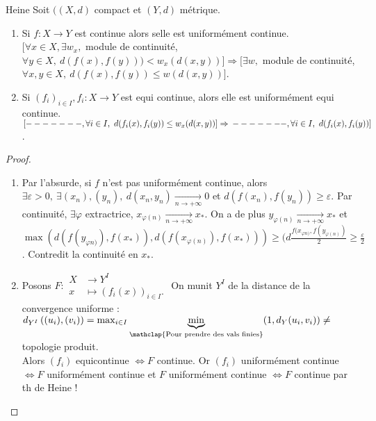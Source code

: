 \begin{theoreme}{Heine}
    Soit $((X,d)$ compact et $(Y,d)$ métrique.
    \begin{enumerate}
        \item Si $f:X\to Y$ est continue alors selle est uniformément continue.\\
            $[\forall x\in X,\exists w_x,$ module de continuité, $\forall y\in X,\ d(f(x),f(y)))<w_x(d(x,y))]\Rightarrow [\exists w,$ module de continuité, $\forall x,y\in X,\ d(f(x),f(y))\le w(d(x,y))] $.

        \item Si $(f_i)_{i\in I}, f_i: X\to Y$ est equi continue, alors elle est uniformément equi continue.\\
            $[-------, \forall i\in I,\ d(f_i(x),f_i(y))\le w_x(d(x,y))]\Rightarrow\\-------, \forall i\in I,\ d(f_i(x),f_i(y))] $.
    \end{enumerate}
\end{theoreme}
\begin{proof}
    \begin{enumerate}
        \item Par l'absurde, si $f$ n'est pas uniformément continue, alors$\exists \varepsilon >0,\ \exists (x_n),(y_n),\ d(x_n,y_n)\underset{n\to +\infty}{\longrightarrow} 0$ et $d(f(x_{n}),f(y_n))\ge \varepsilon .$ Par continuité, $\exists \varphi $ extractrice, $x_{\varphi (n)}\underset{n\to +\infty}{\longrightarrow} x_*.$ On a de plus $y_{\varphi (n)}\underset{n\to +\infty}{\longrightarrow} x_*$ et $\max(d(f(y_{\varphi n)}),f(x_*)),d(f(x_{\varphi (n)}),f(x_*)))\ge (d\frac{f(x_{\varphi n)},f(y_{\varphi (n)})}{2}\ge \frac{\varepsilon}{2}$. Contredit la continuité en $x_*.$
        \item Posons $F :\begin{aligned}
            X &\longrightarrow Y^I \\
            x &\longmapsto \left(f_i(x)\right)_{i\in I}.
        \end{aligned}$ On munit $Y^I$ de la distance de la convergence uniforme : $d_{Y^I}\left( (u_i), (v_i) \right) =\max_{i\in I}\underbrace{\min}_{\mathclap{\text{Pour prendre des vals finies}}}(1,d_Y(u_i,v_i))\neq $ topologie produit. \\
        Alors $(f_i)$ equicontinue $\Leftrightarrow F$ continue. Or $\left( f_i \right) $ uniformément continue $\Leftrightarrow F$ uniformément continue et $F$ uniformément continue $\Leftrightarrow F$ continue par th de Heine !
    \end{enumerate}
\end{proof}

